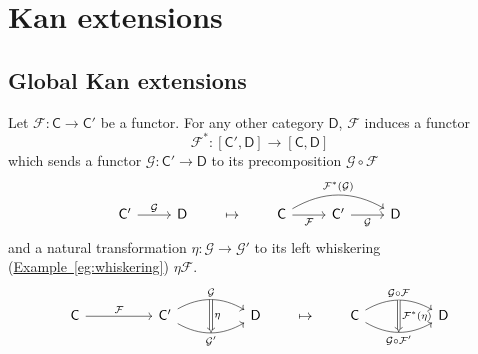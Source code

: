 \documentclass[notes.tex]{subfiles}
\begin{document}
\chapter{Kan extensions}\label{sec:kan_extensions}

\section{Global Kan extensions}
\label{sec:global_kan_extensions}

Let $\mathcal{F}\colon \mathsf{C} \to \mathsf{C}'$ be a functor. For any other category $\mathsf{D}$, $\mathcal{F}$ induces a functor
\begin{equation*}
  \mathcal{F}^{*}\colon [\mathsf{C}', \mathsf{D}] \to [\mathsf{C}, \mathsf{D}]
\end{equation*}
which sends a functor $\mathcal{G}\colon \mathsf{C}' \to \mathsf{D}$ to its precomposition $\mathcal{G} \circ \mathcal{F}$
\begin{equation*}
  \begin{tikzcd}
    \mathsf{C}'
    \arrow[r, "\mathcal{G}"]
    & \mathsf{D}
  \end{tikzcd}
  \qquad
  \mapsto
  \qquad
  \begin{tikzcd}
    \mathsf{C}
    \arrow[r, swap, "\mathcal{F}"]
    \arrow[rr, bend left, "\mathcal{F}^{*}(\mathcal{G})"]
    & \mathsf{C'}
    \arrow[r, swap, "\mathcal{G}"]
    & \mathsf{D}
  \end{tikzcd}
\end{equation*}
and a natural transformation $\eta\colon \mathcal{G} \to \mathcal{G}'$ to its left whiskering (\hyperref[eg:whiskering]{Example~\ref*{eg:whiskering}}) $\eta\mathcal{F}$.
\begin{equation*}
  \begin{tikzcd}[column sep=huge]
    \mathsf{C}
    \arrow[r, "\mathcal{F}"]
    &\mathsf{C}'
    \arrow[r, bend left, "\mathcal{G}"{name=U}]
    \arrow[r, bend right, swap, "\mathcal{G}'"{name=D}]
    & \mathsf{D}
    \arrow[from=U, to=D, Rightarrow, "\eta"]
  \end{tikzcd} 
  \qquad
  \mapsto
  \qquad
  \begin{tikzcd}[column sep=huge]
    \mathsf{C}
    \arrow[r, bend left, "\mathcal{G} \circ \mathcal{F}"{name=U}]
    \arrow[r, bend right, swap, "\mathcal{G} \circ \mathcal{F}'"{name=D}]
    & \mathsf{D}
    \arrow[from=U, to=D, Rightarrow, "\mathcal{F}^{*}(\eta)"]
  \end{tikzcd}
\end{equation*}
\end{document}
